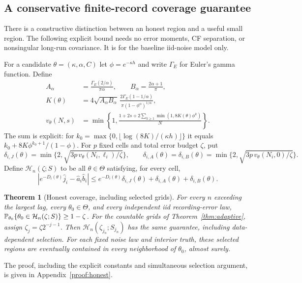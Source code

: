 \documentclass[11pt,a4paper]{article}
\newtheorem{theorem}{Theorem}[section]
\theoremstyle{remark}\newtheorem{remark}[theorem]{Remark}
\begin{document}
\subsection{A conservative finite-record coverage guarantee}\label{sec:honest}
There is a constructive distinction between an honest region and a useful small region. The following explicit bound needs no error moments, CF separation, or nonsingular long-run covariance. It is for the baseline iid-noise model only.

For a candidate $\theta=(\kappa,\alpha,C)$ let $\phi=e^{-\kappa h}$ and write $\Gamma_{\!E}$ for Euler's gamma function. Define
\begin{align}
A_\alpha&=\frac{\Gamma_{\!E}(2/\alpha)}{\pi\alpha},\qquad
B_\alpha=\frac{2\alpha+1}{\pi},\nonumber\\
K(\theta)&=4\sqrt{A_\alpha B_\alpha}\,
\frac{2\Gamma_{\!E}(1-1/\alpha)}{\pi(1-\phi^\alpha)^{1/\alpha}},\label{eq:explicitK}\\
v_\theta(N,s)&=\min\left\{1,\frac{1+2s+2\sum_{k\ge1}\min(1,8K(\theta)\phi^k)}{N}\right\}.
\label{eq:varbound}
\end{align}
The sum is explicit: for $k_0=\max\{0,\lfloor\log(8K)/(\kappa h)\rfloor\}$ it equals
$k_0+8K\phi^{k_0+1}/(1-\phi)$. For $p$ fixed cells and total error budget $\zeta$, put
\[
\delta_{i,J}(\theta)=\min\{2,\sqrt{3p\,v_\theta(N_i,\ell_i)/\zeta}\},\qquad
\delta_{i,A}(\theta)=\delta_{i,B}(\theta)=\min\{2,\sqrt{3p\,v_\theta(N_i,0)/\zeta}\}.
\]
Define $\mathcal H_n(\zeta;S)$ to be all $\theta\in\Theta$ satisfying, for every cell,
\begin{equation}\label{eq:honest}
|e^{-D_i(\theta)}\widehat j_i-\widehat a_i\widehat b_i|
\le e^{-D_i(\theta)}\delta_{i,J}(\theta)+\delta_{i,A}(\theta)+\delta_{i,B}(\theta).
\end{equation}

\begin{theorem}[Honest coverage, including selected grids]\label{thm:honest}
For every $n$ exceeding the largest lag, every $\theta_0\in\Theta$, and every independent iid recording-error law,
$\mathbb P_{\theta_0}\{\theta_0\in\mathcal H_n(\zeta;S)\}\ge1-\zeta$.
For the countable grids of Theorem~\ref{thm:adaptive}, assign $\zeta_j=\zeta 2^{-j-1}$. Then
$\mathcal H_n(\zeta_{j_n};S_{j_n})$ has the same guarantee, including data-dependent selection. For each fixed noise law and interior truth, these selected regions are eventually contained in every neighborhood of $\theta_0$, almost surely.
\end{theorem}
The proof, including the explicit constants and simultaneous selection argument, is given in Appendix~\ref{proof:honest}.
\end{document}
